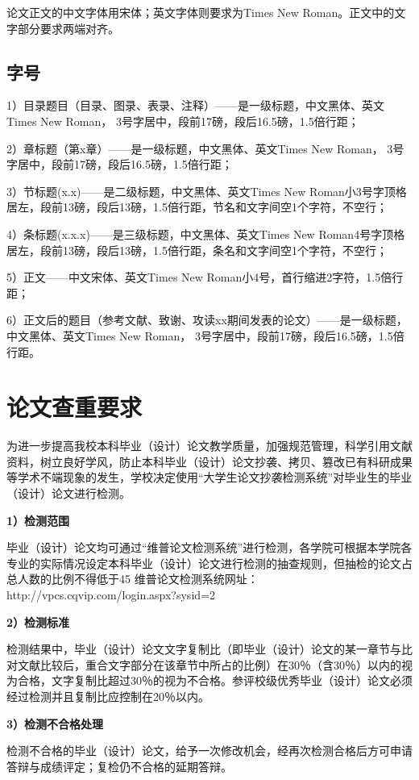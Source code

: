 论文正文的中文字体用宋体；英文字体则要求为Times New Roman。正文中的文字部分要求两端对齐。

\subsection{字号}

1）目录题目（目录、图录、表录、注释）——是一级标题，中文黑体、英文Times New Roman， 3号字居中，段前17磅，段后16.5磅，1.5倍行距；

2）章标题（第x章）——是一级标题，中文黑体、英文Times New Roman， 3号字居中，段前17磅，段后16.5磅，1.5倍行距；

3）节标题(x.x)——是二级标题，中文黑体、英文Times New Roman小3号字顶格居左，段前13磅，段后13磅，1.5倍行距，节名和文字间空1个字符，不空行；

4）条标题(x.x.x)——是三级标题，中文黑体、英文Times New Roman4号字顶格居左，段前13磅，段后13磅，1.5倍行距，条名和文字间空1个字符，不空行；

5）正文——中文宋体、英文Times New Roman小4号，首行缩进2字符，1.5倍行距；

6）正文后的题目（参考文献、致谢、攻读xx期间发表的论文）——是一级标题，中文黑体、英文Times New Roman， 3号字居中，段前17磅，段后16.5磅，1.5倍行距。


\section{论文查重要求}

为进一步提高我校本科毕业（设计）论文教学质量，加强规范管理，科学引用文献资料，树立良好学风，防止本科毕业（设计）论文抄袭、拷贝、篡改已有科研成果等学术不端现象的发生，学校决定使用“大学生论文抄袭检测系统”对毕业生的毕业（设计）论文进行检测。

\textbf{1）检测范围}

毕业（设计）论文均可通过“维普论文检测系统”进行检测，各学院可根据本学院各专业的实际情况设定本科毕业（设计）论文进行检测的抽查规则，但抽检的论文占总人数的比例不得低于45%
维普论文检测系统网址：http://vpcs.cqvip.com/login.aspx?sysid=2

\textbf{2）检测标准}

检测结果中，毕业（设计）论文文字复制比（即毕业（设计）论文的某一章节与比对文献比较后，重合文字部分在该章节中所占的比例）在30％（含30％）以内的视为合格，文字复制比超过30％的视为不合格。参评校级优秀毕业（设计）论文必须经过检测并且复制比应控制在20％以内。

\textbf{3）检测不合格处理}

检测不合格的毕业（设计）论文，给予一次修改机会，经再次检测合格后方可申请答辩与成绩评定；复检仍不合格的延期答辩。

